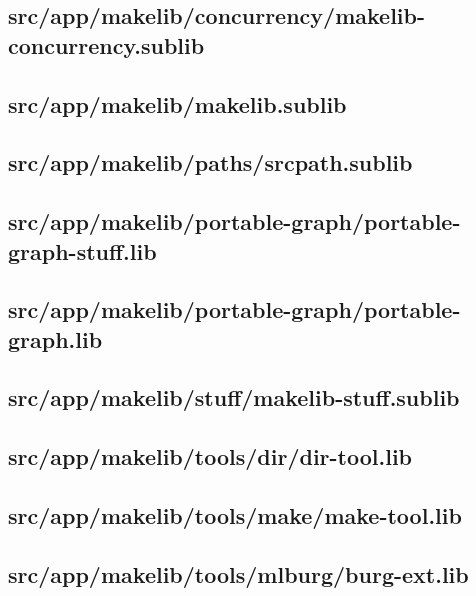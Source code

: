 \subsection{src/app/makelib/concurrency/makelib-concurrency.sublib}


\subsection{src/app/makelib/makelib.sublib}


\subsection{src/app/makelib/paths/srcpath.sublib}


\subsection{src/app/makelib/portable-graph/portable-graph-stuff.lib}


\subsection{src/app/makelib/portable-graph/portable-graph.lib}


\subsection{src/app/makelib/stuff/makelib-stuff.sublib}


\subsection{src/app/makelib/tools/dir/dir-tool.lib}


\subsection{src/app/makelib/tools/make/make-tool.lib}


\subsection{src/app/makelib/tools/mlburg/burg-ext.lib}


